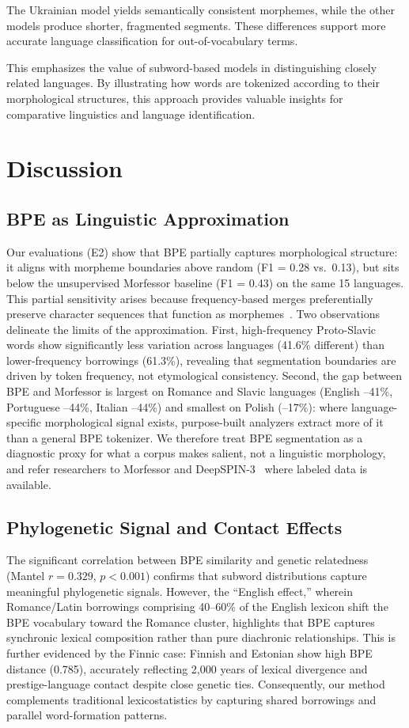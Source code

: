 \documentclass[11pt]{article}
\begin{document}
The Ukrainian model yields semantically consistent morphemes, while the other models produce shorter, fragmented segments. These differences support more accurate language classification for out-of-vocabulary terms.

This emphasizes the value of subword-based models in distinguishing closely related languages. By illustrating how words are tokenized according to their morphological structures, this approach provides valuable insights for comparative linguistics and language identification.

\section{Discussion}

\subsection{BPE as Linguistic Approximation}
Our evaluations (E2) show that BPE partially captures morphological structure: it aligns with morpheme boundaries above random (F1 = 0.28 vs.\ 0.13), but sits below the unsupervised Morfessor baseline (F1 = 0.43) on the same 15 languages. This partial sensitivity arises because frequency-based merges preferentially preserve character sequences that function as morphemes~\citep{sennrich2016neural}. Two observations delineate the limits of the approximation. First, high-frequency Proto-Slavic words show significantly less variation across languages (41.6\% different) than lower-frequency borrowings (61.3\%), revealing that segmentation boundaries are driven by token frequency, not etymological consistency. Second, the gap between BPE and Morfessor is largest on Romance and Slavic languages (English --41\%, Portuguese --44\%, Italian --44\%) and smallest on Polish (--17\%): where language-specific morphological signal exists, purpose-built analyzers extract more of it than a general BPE tokenizer. We therefore treat BPE segmentation as a diagnostic proxy for what a corpus makes salient, not a linguistic morphology, and refer researchers to Morfessor and DeepSPIN-3~\citep{peters-martins-2022-beyond} where labeled data is available.

\subsection{Phylogenetic Signal and Contact Effects}
The significant correlation between BPE similarity and genetic relatedness (Mantel $r = 0.329$, $p < 0.001$) confirms that subword distributions capture meaningful phylogenetic signals. However, the ``English effect,'' wherein Romance/Latin borrowings comprising 40--60\% of the English lexicon shift the BPE vocabulary toward the Romance cluster, highlights that BPE captures synchronic lexical composition rather than pure diachronic relationships. This is further evidenced by the Finnic case: Finnish and Estonian show high BPE distance (0.785), accurately reflecting 2,000 years of lexical divergence and prestige-language contact despite close genetic ties. Consequently, our method complements traditional lexicostatistics by capturing shared borrowings and parallel word-formation patterns.
\end{document}
